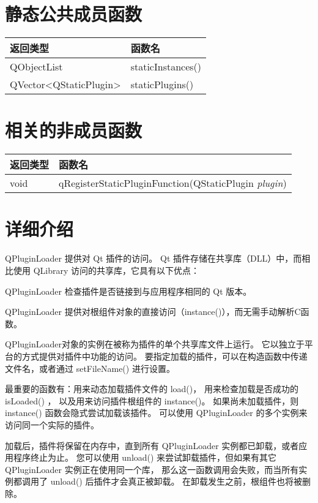 \section{静态公共成员函数}

\begin{tabular}{|l|l|}
\hline
返回类型& 	函数名\\
\hline
QObjectList	&staticInstances() \\
\hline
QVector<QStaticPlugin> &	staticPlugins() \\
\hline
\end{tabular}


\section{相关的非成员函数}

\begin{tabular}{|l|l|}
\hline
返回类型& 	函数名\\
\hline
void	& qRegisterStaticPluginFunction(QStaticPlugin \emph{plugin}) \\
\hline
\end{tabular}


\section{详细介绍}

QPluginLoader 提供对 Qt 插件的访问。
Qt 插件存储在共享库（DLL）中，而相比使用 QLibrary 访问的共享库，它具有以下优点：

\begin{compactitem}[\arr]
\item QPluginLoader 检查插件是否链接到与应用程序相同的 Qt 版本。
\item QPluginLoader 提供对根组件对象的直接访问（instance()），而无需手动解析C函数。
\end{compactitem}

QPluginLoader对象的实例在被称为插件的单个共享库文件上运行。
它以独立于平台的方式提供对插件中功能的访问。
要指定加载的插件，可以在构造函数中传递文件名，或者通过 setFileName() 进行设置。

最重要的函数有：用来动态加载插件文件的 load()，
用来检查加载是否成功的 isLoaded() ， 以及用来访问插件根组件的 instance()。
如果尚未加载插件，则 instance() 函数会隐式尝试加载该插件。
 可以使用 QPluginLoader 的多个实例来访问同一个实际的插件。

加载后，插件将保留在内存中，直到所有 QPluginLoader 实例都已卸载，或者应用程序终止为止。
您可以使用 unload() 来尝试卸载插件，但如果有其它 QPluginLoader 实例正在使用同一个库，
那么这一函数调用会失败，而当所有实例都调用了 unload() 后插件才会真正被卸载。
在卸载发生之前，根组件也将被删除。

